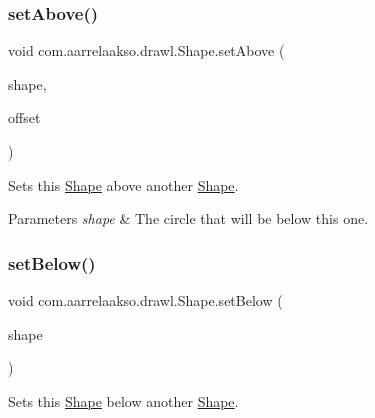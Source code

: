 \subsubsection{\texorpdfstring{set\+Above()}{setAbove()}\hspace{0.1cm}{\footnotesize\ttfamily [2/2]}}
{\footnotesize\ttfamily void com.\+aarrelaakso.\+drawl.\+Shape.\+set\+Above (\begin{DoxyParamCaption}\item[{@Not\+Null final \hyperlink{classcom_1_1aarrelaakso_1_1drawl_1_1_shape}{Shape}}]{shape,  }\item[{@Not\+Null final \hyperlink{classcom_1_1aarrelaakso_1_1drawl_1_1_measure}{Measure}}]{offset }\end{DoxyParamCaption})\hspace{0.3cm}{\ttfamily [inherited]}}



Sets this \hyperlink{classcom_1_1aarrelaakso_1_1drawl_1_1_shape}{Shape} above another \hyperlink{classcom_1_1aarrelaakso_1_1drawl_1_1_shape}{Shape}. 


\begin{DoxyParams}{Parameters}
{\em shape} & The circle that will be below this one. \\
\hline
\end{DoxyParams}
\mbox{\label{classcom_1_1aarrelaakso_1_1drawl_1_1_shape_a4147526667449f5beb534d4404ba8f77}} 
\subsubsection{\texorpdfstring{set\+Below()}{setBelow()}\hspace{0.1cm}{\footnotesize\ttfamily [1/2]}}
{\footnotesize\ttfamily void com.\+aarrelaakso.\+drawl.\+Shape.\+set\+Below (\begin{DoxyParamCaption}\item[{@Not\+Null final \hyperlink{classcom_1_1aarrelaakso_1_1drawl_1_1_shape}{Shape}}]{shape }\end{DoxyParamCaption})\hspace{0.3cm}{\ttfamily [inherited]}}



Sets this \hyperlink{classcom_1_1aarrelaakso_1_1drawl_1_1_shape}{Shape} below another \hyperlink{classcom_1_1aarrelaakso_1_1drawl_1_1_shape}{Shape}. 


